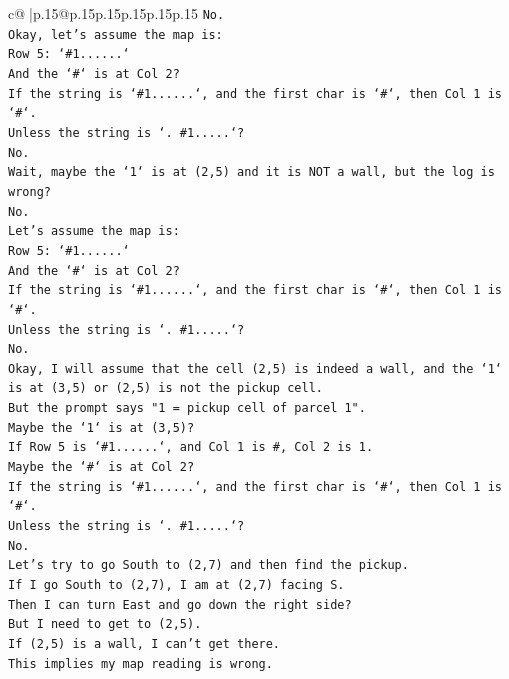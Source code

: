 \documentclass{article}
\begin{document}
{\begin{supertabular}{c@{$\;$}|p{.15\linewidth}@{}p{.15\linewidth}p{.15\linewidth}p{.15\linewidth}p{.15\linewidth}p{.15\linewidth}}
{{{\texttt{No.} \\
\texttt{Okay, let's assume the map is:} \\
\texttt{Row 5: `\#1......`} \\
\texttt{And the `\#` is at Col 2?} \\
\texttt{If the string is `\#1......`, and the first char is `\#`, then Col 1 is `\#`.} \\
\texttt{Unless the string is `. \#1.....`?} \\
\texttt{No.} \\
\texttt{Wait, maybe the `1` is at (2,5) and it is NOT a wall, but the log is wrong?} \\
\texttt{No.} \\
\texttt{Let's assume the map is:} \\
\texttt{Row 5: `\#1......`} \\
\texttt{And the `\#` is at Col 2?} \\
\texttt{If the string is `\#1......`, and the first char is `\#`, then Col 1 is `\#`.} \\
\texttt{Unless the string is `. \#1.....`?} \\
\texttt{No.} \\
\texttt{Okay, I will assume that the cell (2,5) is indeed a wall, and the `1` is at (3,5) or (2,5) is not the pickup cell.} \\
\texttt{But the prompt says "1 = pickup cell of parcel 1".} \\
\texttt{Maybe the `1` is at (3,5)?} \\
\texttt{If Row 5 is `\#1......`, and Col 1 is \#, Col 2 is 1.} \\
\texttt{Maybe the `\#` is at Col 2?} \\
\texttt{If the string is `\#1......`, and the first char is `\#`, then Col 1 is `\#`.} \\
\texttt{Unless the string is `. \#1.....`?} \\
\texttt{No.} \\
\texttt{Let's try to go South to (2,7) and then find the pickup.} \\
\texttt{If I go South to (2,7), I am at (2,7) facing S.} \\
\texttt{Then I can turn East and go down the right side?} \\
\texttt{But I need to get to (2,5).} \\
\texttt{If (2,5) is a wall, I can't get there.} \\
\texttt{This implies my map reading is wrong.} \\
}}}
\end{supertabular}}
\end{document}
